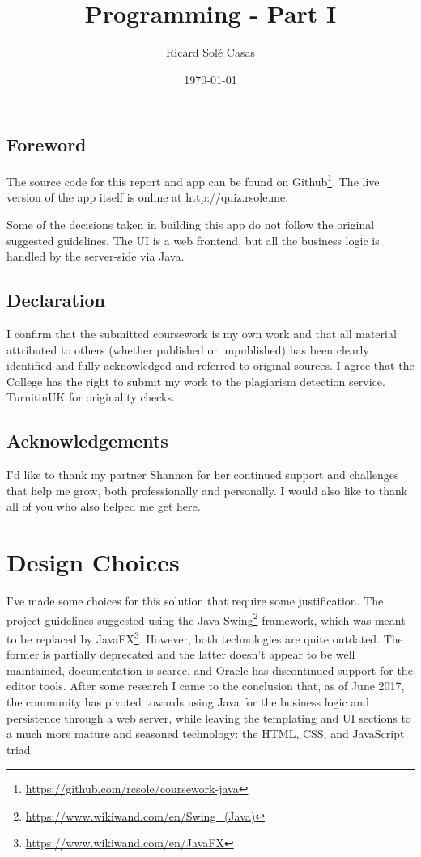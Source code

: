 \documentclass[english,a4paper,]{report}
\title{Programming - Part I}
\author{Ricard Solé Casas}
\institute{Google UK \and Ada National College for Digital Skills}
\date{\today}
\renewcommand{\href}[2]{#2\footnote{\url{#1}}}
\begin{document}
\maketitle

\vspace*{\fill}

\section*{Foreword}

The source code for this report and app can be found on
\href{https://github.com/rcsole/coursework-java}{Github}. The live
version of the app itself is online at http://quiz.rsole.me.

Some of the decisions taken in building this app do not follow the
original suggested guidelines. The UI is a web frontend, but all the
business logic is handled by the server-side via Java.

\section*{Declaration}

I confirm that the submitted coursework is my own work and that all
material attributed to others (whether published or unpublished) has
been clearly identified and fully acknowledged and referred to original
sources. I agree that the College has the right to submit my work to the
plagiarism detection service. TurnitinUK for originality checks.

\section*{Acknowledgements}

I'd like to thank my partner Shannon for her continued support and
challenges that help me grow, both professionally and personally. I
would also like to thank all of you who also helped me get here.

\vspace*{\fill}

{
\setcounter{tocdepth}{2}
\tableofcontents
}
\chapter{Design Choices}\label{design-choices}

I've made some choices for this solution that require some
justification. The project guidelines suggested using the Java
\href{https://www.wikiwand.com/en/Swing_(Java)}{Swing} framework, which
was meant to be replaced by
\href{https://www.wikiwand.com/en/JavaFX}{JavaFX}. However, both
technologies are quite outdated. The former is partially deprecated and
the latter doesn't appear to be well maintained, documentation is
scarce, and Oracle has discontinued support for the editor tools. After
some research I came to the conclusion that, as of June 2017, the
community has pivoted towards using Java for the business logic and
persistence through a web server, while leaving the templating and UI
sections to a much more mature and seasoned technology: the HTML, CSS,
and JavaScript triad.
\end{document}
